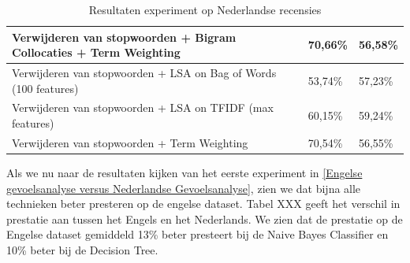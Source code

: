 \begin{table}[h]
\begin{adjustbox}{width=1\textwidth}
\begin{tabular}{|l|l|l|}
Verwijderen van stopwoorden + Bigram Collocaties + Term Weighting                    & 70,66\%                               & 56,58\%                      \\ \hline
Verwijderen van stopwoorden + LSA on Bag of Words (100 features)                     & 53,74\%                               & 57,23\%                      \\ \hline
Verwijderen van stopwoorden + LSA on TFIDF (max features)                            & 60,15\%                               & 59,24\%                      \\ \hline
Verwijderen van stopwoorden + Term Weighting                                         & 70,54\%                               & 56,55\%                      \\ \hline
\end{tabular}
\end{adjustbox}
\caption{Resultaten experiment op Nederlandse recensies}
\end{table}


Als we nu naar de resultaten kijken van het eerste experiment in \ref{Engelse gevoelsanalyse versus Nederlandse Gevoelsanalyse}, zien we dat bijna alle technieken beter presteren op de engelse dataset. Tabel XXX geeft het verschil in prestatie aan tussen het Engels en het Nederlands. We zien dat de prestatie op de Engelse dataset gemiddeld 13\% beter presteert bij de Naive Bayes Classifier en 10\% beter bij de Decision Tree.\\

